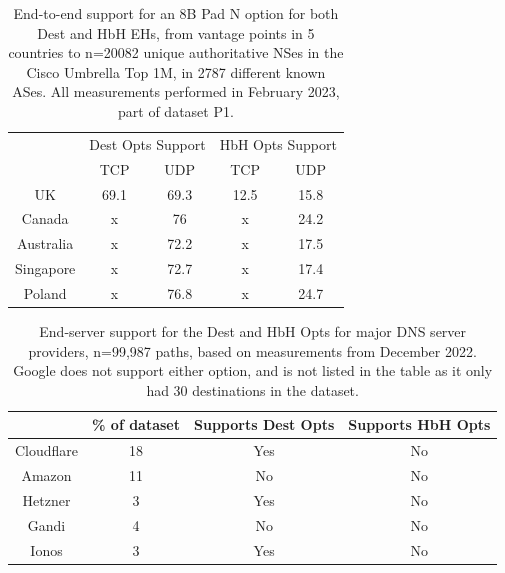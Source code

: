 \documentclass[conference]{IEEEtran}
\begin{document}
\begin{table}[]
\begin{tabular}{c|cc|cc}
\multicolumn{1}{l|}{} & \multicolumn{2}{c|}{Dest Opts Support} & \multicolumn{2}{c}{HbH Opts Support} \\ \cline{2-5} 
\multicolumn{1}{l|}{} & \multicolumn{1}{c|}{TCP}       & UDP      & \multicolumn{1}{c|}{TCP}     & UDP     \\ \hline
UK                    & \multicolumn{1}{c|}{69.1}      & 69.3    & \multicolumn{1}{c|}{12.5}    & 15.8  \\ \hline
Canada                & \multicolumn{1}{c|}{x}      & 76     & \multicolumn{1}{c|}{x}    & 24.2  \\ \hline
Australia             & \multicolumn{1}{c|}{x}        & 72.2      & \multicolumn{1}{c|}{x}    & 17.5  \\ \hline
Singapore             & \multicolumn{1}{c|}{x}      & 72.7    & \multicolumn{1}{c|}{x}    & 17.4   \\ \hline
Poland                & \multicolumn{1}{c|}{x}      & 76.8   & \multicolumn{1}{c|}{x}    & 24.7   
\end{tabular}
\label{tbl:e2e_traversal}
\caption{End-to-end support for an 8B Pad N option for both Dest and HbH EHs, from vantage points in 5 countries to n=20082 unique authoritative NSes in the Cisco Umbrella Top 1M, in 2787 different known ASes. All measurements performed in February 2023, part of dataset P1. }
\end{table}

\begin{table}[]
\begin{tabular}{c|c|c|c}
           & \% of dataset & Supports Dest Opts & Supports HbH Opts \\
\hline
Cloudflare & 18                      & Yes                & No                 \\
\hline
Amazon     & 11                     & No                 & No                 \\
\hline
Hetzner    & 3                     & Yes                & No                 \\
\hline
Gandi      & 4                     & No                 & No                 \\
\hline
Ionos      & 3                    & Yes                & No                
\end{tabular}
\label{tbl:provider_support}
\caption{End-server support for the Dest and HbH Opts for major DNS server providers, n=99,987 paths, based on measurements from December 2022. Google does not support either option, and is not listed in the table as it only had 30 destinations in the dataset.
}
\end{table}
\end{document}
